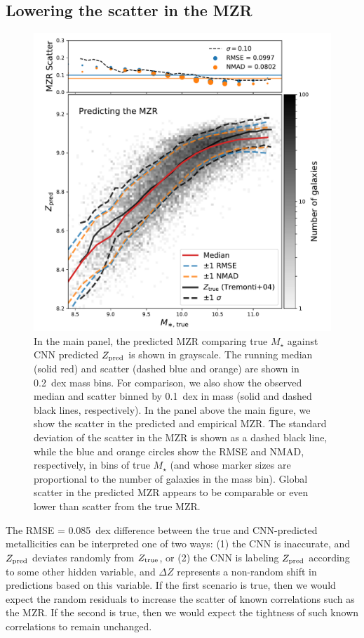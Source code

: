 \documentclass[fleqn,usenatbib]{mnras}
\begin{document}
\subsection{Lowering the scatter in the MZR}
\begin{figure}
	\includegraphics[width=\columnwidth]{05-mzr.pdf}
	\caption{\label{fig:mzr}
		In the main panel, the predicted MZR comparing true $M_\star$ against CNN predicted $Z_{\rm pred}$ is shown in grayscale.
		The running median (solid red) and scatter (dashed blue and orange) are shown in 0.2~dex mass bins.
		For comparison, we also show the \citet{Tremonti2004} observed median and scatter binned by 0.1~dex in mass (solid and dashed black lines, respectively).
		In the panel above the main figure, we show the scatter in the predicted and empirical MZR.
		The standard deviation of the scatter in the MZR is shown as a dashed black line, while the blue and orange circles show the RMSE and NMAD, respectively, in bins of true $M_{\star}$ (and whose marker sizes are proportional to the number of galaxies in the mass bin).
		Global scatter in the predicted MZR appears to be comparable or even lower than scatter from the true MZR.
	}
\end{figure}

The RMSE = 0.085~dex difference between the true and CNN-predicted metallicities can be interpreted one of two ways:
(1) the CNN is inaccurate, and $Z_{\rm pred}$ deviates randomly from $Z_{\rm true}$, or
(2) the CNN is labeling $Z_{\rm pred}$ according to some other hidden variable, and $\Delta Z$ represents a non-random shift in predictions based on this variable.
If the first scenario is true, then we would expect the random residuals to increase the scatter of known correlations such as the MZR.
If the second is true, then we would expect the tightness of such known correlations to remain unchanged.
\end{document}
